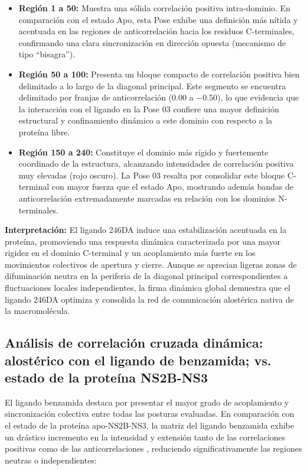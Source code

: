 \begin{itemize}
    \item \textbf{Región 1 a 50:} Muestra una sólida correlación positiva intra-dominio. En comparación con el estado Apo, esta Pose exhibe una definición más nítida y acentuada en las regiones de anticorrelación  hacia los residuos C-terminales, confirmando una clara sincronización en dirección opuesta (mecanismo de tipo ``bisagra'').
    
    \item \textbf{Región 50 a 100:} Presenta un bloque compacto de correlación positiva bien delimitado a lo largo de la diagonal principal. Este segmento se encuentra delimitado por franjas de anticorrelación ($0.00$ a $-0.50$), lo que evidencia que la interacción con el ligando en la Pose 03 confiere una mayor definición estructural y confinamiento dinámico a este dominio con respecto a la proteína libre.
    
    \item \textbf{Región 150 a 240:} Constituye el dominio más rígido y fuertemente coordinado de la estructura, alcanzando intensidades de correlación positiva muy elevadas (rojo oscuro). La Pose 03 resalta por consolidar este bloque C-terminal con mayor fuerza que el estado Apo, mostrando además bandas de anticorrelación extremadamente marcadas en relación con los dominios N-terminales.
\end{itemize}

\textbf{Interpretación:} El ligando 246DA induce una estabilización acentuada en la proteína, promoviendo una respuesta dinámica caracterizada por una mayor rigidez en el dominio C-terminal y un acoplamiento más fuerte en los movimientos colectivos de apertura y cierre. Aunque se aprecian ligeras zonas de difuminación neutra  en la periferia de la diagonal principal correspondientes a fluctuaciones locales independientes, la firma dinámica global demuestra que el ligando 246DA optimiza y consolida la red de comunicación alostérica nativa de la macromolécula.

\subsection*{Análisis de correlación cruzada dinámica: alostérico con el ligando de benzamida;  vs. estado de la proteína NS2B-NS3}

El ligando benzamida destaca por presentar el mayor grado de acoplamiento y sincronización colectiva entre todas las posturas evaluadas. En comparación con el estado de la proteína apo-NS2B-NS3, la matriz del ligando benzamida exhibe un drástico incremento en la intensidad y extensión tanto de las correlaciones positivas  como de las anticorrelaciones , reduciendo significativamente las regiones neutras o independientes:

